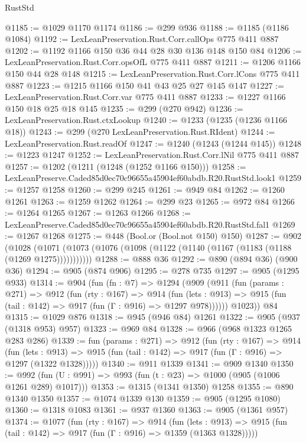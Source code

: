 \begin{lexlean}{RustStd}
\begin{coremodule}
@1185 := @1029 @1170 @1174
@1186 := @299 @936
@1188 := @1185 (@1186 @1084)
@1192 := LexLeanPreservation.Rust.Corr.callOps @775 @411 @887
@1202 := @1192 @1166 @150 @36 @44 @28 @30 @136 @148 @150 @84
@1206 := LexLeanPreservation.Rust.Corr.opsOfL @775 @411 @887
@1211 := @1206 @1166 @150 @44 @28 @148
@1215 := LexLeanPreservation.Rust.Corr.lCons @775 @411 @887
@1223 := @1215 @1166 @150 @41 @43 @25 @27 @145 @147
@1227 := LexLeanPreservation.Rust.Corr.var @775 @411 @887
@1233 := @1227 @1166 @150 @18 @25 @18 @145
@1235 := @299 (@270 @942)
@1236 := LexLeanPreservation.Rust.ctxLookup
@1240 := @1233 (@1235 (@1236 @1166 @18))
@1243 := @299 (@270 LexLeanPreservation.Rust.RIdent)
@1244 := LexLeanPreservation.Rust.readOf
@1247 := @1240 (@1243 (@1244 @145))
@1248 := @1223 @1247
@1252 := LexLeanPreservation.Rust.Corr.lNil @775 @411 @887
@1257 := @1202 (@1211 (@1248 (@1252 @1166 @150)))
@1258 := LexLeanPreserve.Caded85d0ec70c96655a45904ef60abdb.R20.RustStd.look1
@1259 := @1257 @1258
@1260 := @299 @245
@1261 := @949 @84
@1262 := @1260 @1261
@1263 := @1259 @1262
@1264 := @299 @23
@1265 := @972 @84
@1266 := @1264 @1265
@1267 := @1263 @1266
@1268 := LexLeanPreserve.Caded85d0ec70c96655a45904ef60abdb.R20.RustStd.fal1
@1269 := @1267 @1268
@1275 := @448 (Bool.or (Bool.not @150) @150)
@1287 := @902
    (@1028 (@1071 (@1073 (@1076 (@1098 (@1122 (@1140 (@1167 (@1183 (@1188 (@1269 @1275)))))))))))
@1288 := @888 @36
@1292 := @890 (@894 @36) (@900 @36)
@1294 := @905 (@874 @906)
@1295 := @278 @735
@1297 := @905 (@1295 @933)
@1314 := @904
    (fun (fn : @7) =>
    @1294
      (@909
        (@911
          (fun (params : @271) =>
          @912
            (fun (rty : @167) =>
            @914
              (fun (lets : @913) =>
              @915 (fun (tail : @142) => @917 (fun (Γ : @916) => @1297 @978))))))
        @1023))
    @84
@1315 := @1029 @876
@1318 := @945 (@946 @84) @1261
@1322 := @905 (@937 (@1318 @953) @957)
@1323 := @969 @84
@1328 := @966 (@968 @1323 @1265 @283 @286)
@1339 := fun (params : @271) =>
  @912
    (fun (rty : @167) =>
    @914
      (fun (lets : @913) =>
      @915 (fun (tail : @142) => @917 (fun (Γ : @916) => @1297 (@1322 @1328)))))
@1340 := @911 @1339
@1341 := @909 @1340
@1350 := @992 (fun (U : @991) => @993 (fun (t : @23) => @1000 (@905 (@1006 @1261 @289) @1017)))
@1353 := @1315 (@1341 @1350) @1258
@1355 := @890 @1340 @1350
@1357 := @1074 @1339 @130
@1359 := @905 (@1295 @1080)
@1360 := @1318 @1083
@1361 := @937 @1360
@1363 := @905 (@1361 @957)
@1374 := @1077
    (fun (rty : @167) =>
    @914
      (fun (lets : @913) =>
      @915 (fun (tail : @142) => @917 (fun (Γ : @916) => @1359 (@1363 @1328)))))

\end{coremodule}
\end{lexlean}
